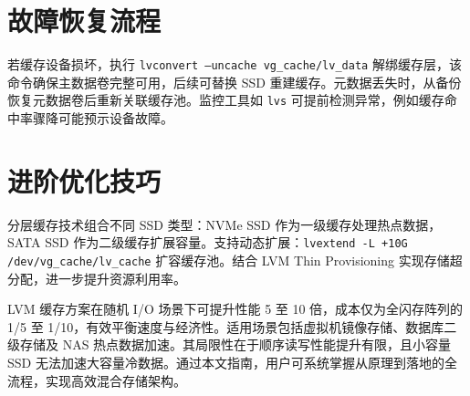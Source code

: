 \section{故障恢复流程}
若缓存设备损坏，执行 \texttt{lvconvert --uncache vg\_{}cache/lv\_{}data} 解绑缓存层，该命令确保主数据卷完整可用，后续可替换 SSD 重建缓存。元数据丢失时，从备份恢复元数据卷后重新关联缓存池。监控工具如 \texttt{lvs} 可提前检测异常，例如缓存命中率骤降可能预示设备故障。\par
\section{进阶优化技巧}
分层缓存技术组合不同 SSD 类型：NVMe SSD 作为一级缓存处理热点数据，SATA SSD 作为二级缓存扩展容量。支持动态扩展：\texttt{lvextend -L +10G /dev/vg\_{}cache/lv\_{}cache} 扩容缓存池。结合 LVM Thin Provisioning 实现存储超分配，进一步提升资源利用率。\par
LVM 缓存方案在随机 I/O 场景下可提升性能 5 至 10 倍，成本仅为全闪存阵列的 1/5 至 1/10，有效平衡速度与经济性。适用场景包括虚拟机镜像存储、数据库二级存储及 NAS 热点数据加速。其局限性在于顺序读写性能提升有限，且小容量 SSD 无法加速大容量冷数据。通过本文指南，用户可系统掌握从原理到落地的全流程，实现高效混合存储架构。\par
